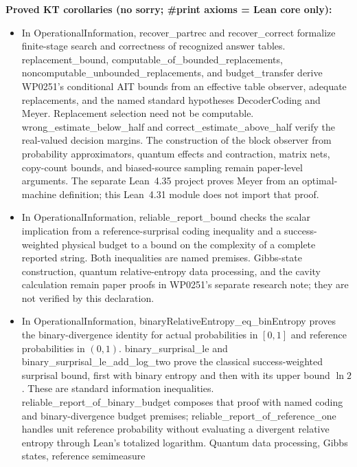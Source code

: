 \documentclass[11pt,a4paper]{article}
\newcommand{\lean}[1]{{\ttfamily\small
  \let\leanunderscore\_\def\_{\leanunderscore\allowbreak}#1}}
\begin{document}
\noindent\textbf{Proved KT corollaries (no \lean{sorry}; \lean{\#print axioms} = Lean core only):}
\begin{itemize}[leftmargin=1.4em,itemsep=1pt]
\item {\raggedright In \lean{OperationalInformation}, \lean{recover\_partrec} and
\lean{recover\_correct} formalize finite-stage search and correctness of recognized answer tables.
\lean{replacement\_bound}, \lean{computable\_of\_bounded\_replacements},
\lean{noncomputable\_unbounded\_replacements}, and \lean{budget\_transfer}
derive WP0251's conditional AIT bounds from an effective table observer,
adequate replacements, and the named standard hypotheses \lean{DecoderCoding}
and \lean{Meyer}. Replacement selection need not be computable.
\lean{wrong\_estimate\_below\_half} and \lean{correct\_estimate\_above\_half}
verify the real-valued decision margins. The construction of the block observer
from probability approximators, quantum effects and contraction, matrix nets,
copy-count bounds, and biased-source sampling remain paper-level arguments.
The separate Lean~4.35 project proves Meyer from an optimal-machine definition;
this Lean~4.31 module does not import that proof.\par}
\item In \lean{OperationalInformation}, \lean{reliable\_report\_bound} checks the scalar
implication from a reference-surprisal coding inequality and a success-weighted
physical budget to a bound on the complexity of a complete reported string.
Both inequalities are named premises. Gibbs-state construction, quantum
relative-entropy data processing, and the cavity calculation remain paper proofs
in WP0251's separate research note; they are not verified by this declaration.
\item {\raggedright In \lean{OperationalInformation},
\lean{binaryRelativeEntropy\_eq\_binEntropy} proves the binary-divergence
identity for actual probabilities in \([0,1]\) and reference probabilities in
\((0,1)\). \lean{binary\_surprisal\_le} and
\lean{binary\_surprisal\_le\_add\_log\_two} prove the classical
success-weighted surprisal bound, first with binary entropy and then with
its upper bound \(\ln2\). These are standard information inequalities.
\lean{reliable\_report\_of\_binary\_budget} composes that proof with
named coding and binary-divergence budget premises;
\lean{reliable\_report\_of\_reference\_one} handles unit reference probability
without evaluating a divergent relative entropy through Lean's totalized
logarithm. Quantum data processing, Gibbs states, reference semimeasure
}
\end{itemize}
\end{document}
